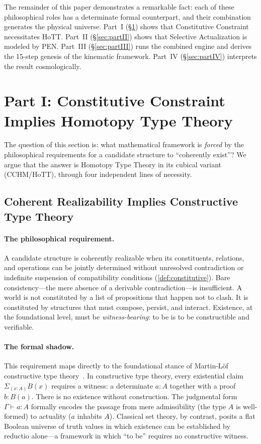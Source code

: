 \documentclass[11pt,a4paper]{article}
\theoremstyle{plain}
\theoremstyle{definition}
\theoremstyle{remark}
\begin{document}
The remainder of this paper demonstrates a remarkable fact: each of these philosophical roles has a determinate formal counterpart, and their combination generates the physical universe.  Part~I (\S\ref{sec:partI}) shows that Constitutive Constraint necessitates HoTT.  Part~II (\S\ref{sec:partII}) shows that Selective Actualization is modeled by PEN.  Part~III (\S\ref{sec:partIII}) runs the combined engine and derives the 15-step genesis of the kinematic framework.  Part~IV (\S\ref{sec:partIV}) interprets the result cosmologically.


\section{Part I: Constitutive Constraint Implies Homotopy Type Theory}
\label{sec:partI}

The question of this section is: what mathematical framework is \emph{forced} by the philosophical requirements for a candidate structure to ``coherently exist''?  We argue that the answer is Homotopy Type Theory in its cubical variant (CCHM/HoTT), through four independent lines of necessity.


\subsection{Coherent Realizability Implies Constructive Type Theory}
\label{sec:constructive}

\paragraph{The philosophical requirement.}
A candidate structure is coherently realizable when its constituents, relations, and operations can be jointly determined without unresolved contradiction or indefinite suspension of compatibility conditions (\cref{def:constitutive}).  Bare consistency---the mere absence of a derivable contradiction---is insufficient.  A world is not constituted by a list of propositions that happen not to clash.  It is constituted by structures that must compose, persist, and interact.  Existence, at the foundational level, must be \emph{witness-bearing}: to be is to be constructible and verifiable.

\paragraph{The formal shadow.}
This requirement maps directly to the foundational stance of Martin-L\"{o}f constructive type theory~\cite{martinlof1984}.  In constructive type theory, every existential claim $\Sigma_{(x:A)} B(x)$ requires a witness: a determinate $a : A$ together with a proof $b : B(a)$.  There is no existence without construction.  The judgmental form $\Gamma \vdash a : A$ formally encodes the passage from mere admissibility (the type $A$ is well-formed) to actuality ($a$ inhabits $A$).  Classical set theory, by contrast, posits a flat Boolean universe of truth values in which existence can be established by reductio alone---a framework in which ``to be'' requires no constructive witness.
\end{document}
